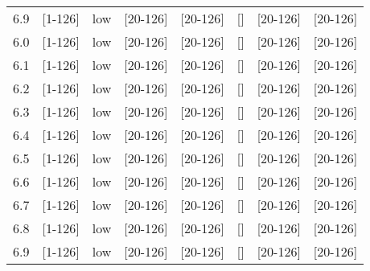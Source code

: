 \documentclass{article}
\begin{document}
\begin{tabular}{ l | l | l | l | l }
      6.9 & [1-126] & low & [20-126] & [20-126] & [] & [20-126] & [20-126] &\\
      6.0 & [1-126] & low & [20-126] & [20-126] & [] & [20-126] & [20-126] &\\
      6.1 & [1-126] & low & [20-126] & [20-126] & [] & [20-126] & [20-126] &\\
      6.2 & [1-126] & low & [20-126] & [20-126] & [] & [20-126] & [20-126] &\\
      6.3 & [1-126] & low & [20-126] & [20-126] & [] & [20-126] & [20-126] &\\
      6.4 & [1-126] & low & [20-126] & [20-126] & [] & [20-126] & [20-126] &\\
      6.5 & [1-126] & low & [20-126] & [20-126] & [] & [20-126] & [20-126] &\\
      6.6 & [1-126] & low & [20-126] & [20-126] & [] & [20-126] & [20-126] &\\
      6.7 & [1-126] & low & [20-126] & [20-126] & [] & [20-126] & [20-126] &\\
      6.8 & [1-126] & low & [20-126] & [20-126] & [] & [20-126] & [20-126] &\\
      6.9 & [1-126] & low & [20-126] & [20-126] & [] & [20-126] & [20-126] &\\
      \hline
    \end{tabular}
\end{document}
